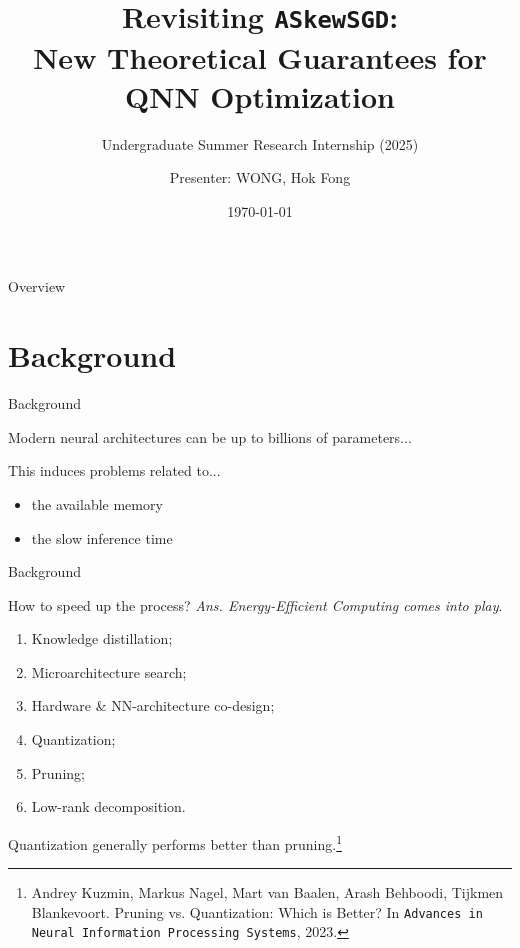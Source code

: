 \documentclass[aspectratio=169,xcolor=dvipsnames]{beamer}
\title{Revisiting \texttt{ASkewSGD}: \\New Theoretical Guarantees for QNN Optimization}
\subtitle{Undergraduate Summer Research Internship (2025)}
\author{Presenter: WONG, Hok Fong}
\institute
{
    Department of Computer Science and Engineering \\
    The Chinese University of Hong Kong %
}
\date{\today} %
\begin{document}
\begin{frame}
    \titlepage
\end{frame}

\begin{frame}{Overview}
    \tableofcontents
\end{frame}

\section{Background}
\begin{frame}{Background}

    Modern neural architectures can be up to billions of parameters...

    This induces problems related to...

    \begin{itemize}
        \item the available memory
        \item the slow inference time
    \end{itemize}
\end{frame}

\begin{frame}{Background}

    How to speed up the process? \textit{Ans. Energy-Efficient Computing comes into play}.

    \begin{enumerate}
        \item Knowledge distillation;
        \item Microarchitecture search;
        \item Hardware \& NN-architecture co-design;
        \item Quantization;
        \item Pruning;
        \item Low-rank decomposition.
    \end{enumerate}


    Quantization generally performs better than pruning.\footnote{Andrey Kuzmin, Markus Nagel, Mart van Baalen, Arash Behboodi, Tijkmen Blankevoort. Pruning vs. Quantization: Which is Better? In \texttt{Advances in Neural Information Processing Systems}, 2023. }
\end{frame}
\end{document}
